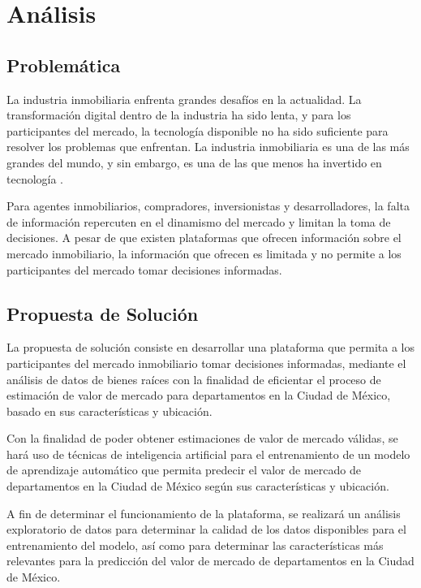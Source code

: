 \chapter{\textcolor{azulescom}{Análisis}}

\section{Problemática}

La industria inmobiliaria enfrenta grandes desafíos en la actualidad. La
transformación digital dentro de la industria ha sido lenta, y para los
participantes del mercado, la tecnología disponible no ha sido suficiente para
resolver los problemas que enfrentan. La industria inmobiliaria es una de las
más grandes del mundo, y sin embargo, es una de las que menos ha invertido en
tecnología \cite{pagourtzi2003}.

Para agentes inmobiliarios, compradores, inversionistas y desarrolladores, la
falta de información repercuten en el dinamismo del mercado y limitan la
toma de decisiones. A pesar de que existen plataformas que ofrecen información
sobre el mercado inmobiliario, la información que ofrecen es limitada y no
permite a los participantes del mercado tomar decisiones informadas.

\section{Propuesta de Solución}

La propuesta de solución consiste en desarrollar una plataforma que permita
a los participantes del mercado inmobiliario tomar decisiones informadas,
mediante el análisis de datos de bienes raíces con la finalidad de eficientar
el proceso de estimación de valor de mercado para departamentos en la Ciudad de
México, basado en sus características y ubicación.

Con la finalidad de poder obtener estimaciones de valor de mercado válidas,
se hará uso de técnicas de inteligencia artificial para el entrenamiento de un
modelo de aprendizaje automático que permita predecir el valor de mercado de
departamentos en la Ciudad de México según sus características y ubicación.

A fin de determinar el funcionamiento de la plataforma, se realizará un análisis
exploratorio de datos para determinar la calidad de los datos disponibles para
el entrenamiento del modelo, así como para determinar las características más
relevantes para la predicción del valor de mercado de departamentos en la Ciudad
de México.

